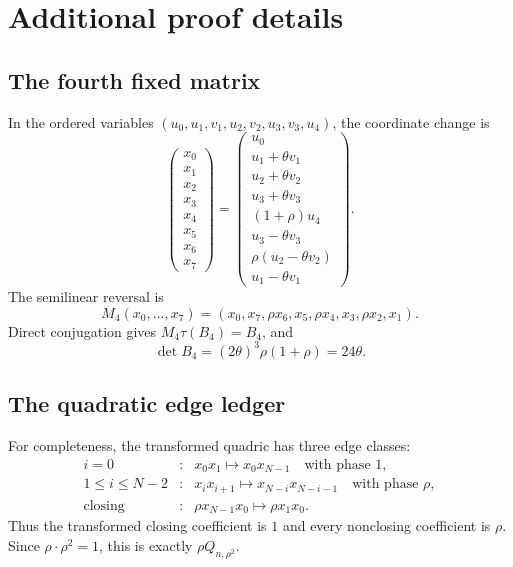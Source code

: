 \section{Additional proof details}
\label{app:proof-details}

\subsection{The fourth fixed matrix}

In the ordered variables
\((u_0,u_1,v_1,u_2,v_2,u_3,v_3,u_4)\), the coordinate change is
\[
\begin{pmatrix}
x_0\\x_1\\x_2\\x_3\\x_4\\x_5\\x_6\\x_7
\end{pmatrix}
=
\begin{pmatrix}
u_0\\
u_1+\theta v_1\\
u_2+\theta v_2\\
u_3+\theta v_3\\
(1+\rho)u_4\\
u_3-\theta v_3\\
\rho(u_2-\theta v_2)\\
u_1-\theta v_1
\end{pmatrix}.
\]
The semilinear reversal is
\[
M_4(x_0,\ldots,x_7)
=(x_0,x_7,\rho x_6,x_5,\rho x_4,x_3,\rho x_2,x_1).
\]
Direct conjugation gives \(M_4\tau(B_4)=B_4\), and
\[
\det B_4=(2\theta)^3\rho(1+\rho)=24\theta.
\]

\subsection{The quadratic edge ledger}

For completeness, the transformed quadric has three edge classes:
\[
\begin{array}{ccl}
i=0&:&x_0x_1\mapsto x_0x_{N-1}
       \quad\text{with phase }1,\\
1\le i\le N-2&:&x_ix_{i+1}\mapsto
       x_{N-i}x_{N-i-1}
       \quad\text{with phase }\rho,\\
\text{closing}&:&\rho x_{N-1}x_0\mapsto
       \rho x_1x_0.
\end{array}
\]
Thus the transformed closing coefficient is \(1\) and every nonclosing
coefficient is \(\rho\).  Since \(\rho\cdot\rho^2=1\), this is exactly
\(\rho Q_{n,\rho^2}\).


